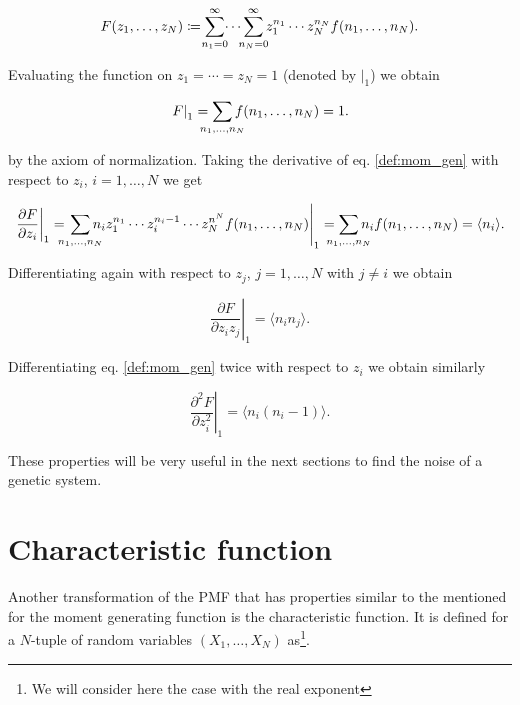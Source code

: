 \begin{equation}
  \label{def:mom_gen}
  F(z_1,\dotsc,z_N) \coloneqq \sum_{\mathclap{n_1=0}}^{\infty} \dotsi \sum_{\mathclap{n_N=0}}^{\infty} z_1^{n_1} \dotsm z_N^{n_N} f(n_1,\dotsc,n_N).
\end{equation}

Evaluating the function on $z_1 = \dotsb = z_N = 1$ (denoted by $\left. \right|_1$) we obtain

\begin{equation}
  \label{eq:con-mom_gen_1}
  \left.F\right|_1 = \sum_{\mathclap{n_1,\dotsc,n_N}}f(n_1,\dotsc,n_N) = 1.
\end{equation}

by the axiom of normalization. Taking the derivative of eq. \ref{def:mom_gen} with respect to $z_i$, $i = 1,\dotsc,N$ we get

\begin{equation}
  \label{eq:con-mom_gen_d1}
  \left.\frac{\partial F}{\partial z_i}\right|_1 = \left.\sum_{\mathclap{n_1,\dotsc,n_N}}n_i z_1^{n_1}\dotsm z_i^{n_i-1}\dotsm z_N^{n^N}f(n_1,\dotsc,n_N)\right|_1 = \sum_{\mathclap{n_1,\dotsc,n_N}} n_i f(n_1,\dotsc,n_N) = \langle n_i \rangle.
\end{equation}

Differentiating again with respect to $z_j$, $j=1,\dotsc,N$ with $j\neq i$ we obtain

\begin{equation}
  \label{eq:con-mom_gen_d1d2}
  \left. \frac{\partial F}{\partial z_i z_j} \right|_1 = \langle n_i n_j \rangle.
\end{equation}

Differentiating eq. \ref{def:mom_gen} twice with respect to $z_i$ we obtain similarly

\begin{equation}
  \label{eq:con-mom_gen_d1d1}
  \left. \frac{\partial^2F}{\partial z_i^2}\right|_1 = \langle n_i(n_i-1) \rangle.
\end{equation}

These properties will be very useful in the next sections to find the noise of a genetic system.

\section{Characteristic function}
\label{sec:con-charac_func}
Another transformation of the PMF that has properties similar to the mentioned for the moment generating function is the characteristic function. It is defined for a $N$-tuple of random variables $(X_1,\dotsc,X_N)$ as\footnote{We will consider here the case with the real exponent}.

